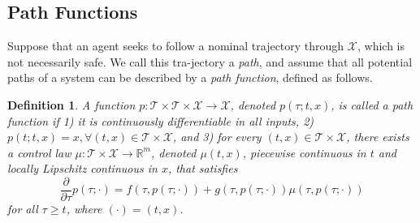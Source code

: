 \documentclass[10pt,conference]{ieeeconf}
\renewcommand{\(}{\left(}
\renewcommand{\)}{\right)}
\renewcommand{\[}{\left[}
\renewcommand{\]}{\right]}
\newcommand{\reals}{\mathbb{R}}
\newtheorem{definition}{Definition}
\begin{document}


\subsection{Path Functions} \label{sec:method_a}

Suppose that an agent seeks to follow a nominal trajectory through $\mathcal{X}$, which is not necessarily safe. We call this {tra-jectory} a \emph{path}, and assume that all potential paths of {a} system can be described by a \emph{path function}, defined as follows.

\begin{definition}%
A function $p:\mathcal{T}\times\mathcal{T}\times\mathcal{X}\rightarrow\mathcal{X}$, denoted $p(\tau; t,x)$, is called a \emph{path function} if 1) it is continuously differentiable in all inputs, 2) $p(t; t,x) = x, \forall (t,x)\in\mathcal{T}\times\mathcal{X}$, and 3) for every $(t,x)\in\mathcal{T}\times\mathcal{X}$, there exists a {control law} $\mu:\mathcal{T}\times\mathcal{X}\rightarrow\reals^m$, denoted $\mu(t,x)$, piecewise continuous in $t$ and locally Lipschitz continuous in $x$, that satisfies
\begin{equation}
    \frac{\partial}{\partial \tau}p(\tau; \cdot) = f(\tau, p(\tau; \cdot)) + g(\tau, p(\tau; \cdot)) \mu(\tau, p(\tau; \cdot)) \label{eq:def_path}
\end{equation}
for all $\tau \geq t$, where $(\cdot)=(t,x)$.
\end{definition}
\end{document}
